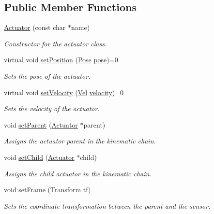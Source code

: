 \subsection*{Public Member Functions}
\begin{DoxyCompactItemize}
\item 
\hyperlink{classrlib_1_1Actuator_a4586932cf12e921639b5186b12f87866}{Actuator} (const char $\ast$name)
\begin{DoxyCompactList}\small\item\em Constructor for the actuator class. \end{DoxyCompactList}\item 
virtual void \hyperlink{classrlib_1_1Actuator_a99eafe0706d84c5aed5d9cc3832996a5}{set\-Position} (\hyperlink{classrlib_1_1Pose}{Pose} \hyperlink{classrlib_1_1Actuator_adcce3f106abc4127382d0d9794bb7b15}{pose})=0
\begin{DoxyCompactList}\small\item\em Sets the pose of the actuator. \end{DoxyCompactList}\item 
virtual void \hyperlink{classrlib_1_1Actuator_a8495e9dee469245fa6eba719b047cb3f}{set\-Velocity} (\hyperlink{classrlib_1_1Vel}{Vel} \hyperlink{classrlib_1_1Actuator_a27372af2dd629e7b434eb541de0a13a8}{velocity})=0
\begin{DoxyCompactList}\small\item\em Sets the velocity of the actuator. \end{DoxyCompactList}\item 
void \hyperlink{classrlib_1_1Actuator_aaba68f5222df9f7878538b36daad068f}{set\-Parent} (\hyperlink{classrlib_1_1Actuator}{Actuator} $\ast$parent)
\begin{DoxyCompactList}\small\item\em Assigns the actuator parent in the kinematic chain. \end{DoxyCompactList}\item 
void \hyperlink{classrlib_1_1Actuator_a9057584b1c8855a525816f9a1a973da4}{set\-Child} (\hyperlink{classrlib_1_1Actuator}{Actuator} $\ast$child)
\begin{DoxyCompactList}\small\item\em Assigns the child actuator in the kinematic chain. \end{DoxyCompactList}\item 
void \hyperlink{classrlib_1_1Actuator_a138ade22d9534a93780f97b5c1af07a6}{set\-Frame} (\hyperlink{classrlib_1_1Transform}{Transform} tf)
\begin{DoxyCompactList}\small\item\em Sets the coordinate transformation between the parent and the sensor. \end{DoxyCompactList}\item 

\end{DoxyCompactItemize}
